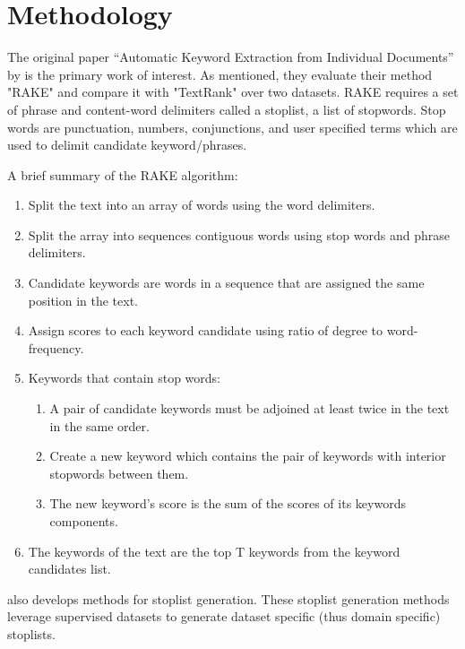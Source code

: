 \documentclass[11pt,a4paper]{article}
\begin{document}
\section{Methodology}

The original paper “Automatic Keyword Extraction from Individual Documents” by \citet{1} is the primary work of interest. As mentioned, they evaluate their method "RAKE" and compare it with "TextRank" over two datasets. RAKE requires a set of phrase and content-word delimiters called a stoplist, a list of stopwords. Stop words are punctuation, numbers, conjunctions, and user specified terms which are used to delimit candidate keyword/phrases. 

A brief summary of the RAKE algorithm:
\begin{enumerate}
	\item Split the text into an array of words using the word delimiters.
	\item Split the array into sequences contiguous words using stop words and phrase delimiters.
	\item Candidate keywords are words in a sequence that are assigned the same position in the text. 
	\item Assign scores to each keyword candidate using ratio of degree to word-frequency. 
	\item Keywords that contain stop words:
	\begin{enumerate}
		\item A pair of candidate keywords must be adjoined at least twice in the text in the same order.
		\item Create a new keyword which contains the pair of keywords with interior stopwords between them.
		\item The new keyword’s score is the sum of the scores of its keywords components.
	\end{enumerate}
	\item The keywords of the text are the top T keywords from the keyword candidates list.
\end{enumerate}

\citet{1} also develops methods for stoplist generation. These stoplist generation methods leverage supervised datasets to generate dataset specific (thus domain specific) stoplists. 
\end{document}
